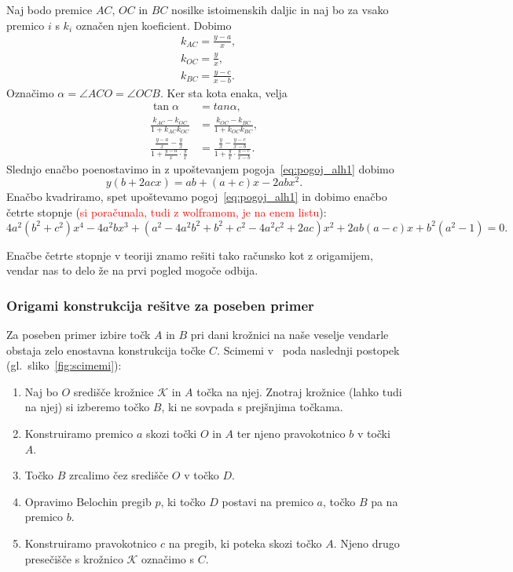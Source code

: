 Naj bodo premice $AC$, $OC$ in $BC$ nosilke istoimenskih daljic in naj bo za vsako premico $i$ s $k_i$ označen njen koeficient. Dobimo
\begin{align*}
    &k_{AC} = \frac{y-a}{x}, \\
    &k_{OC} = \frac{y}{x}, \\
    &k_{BC} = \frac{y-c}{x-b}.
\end{align*}
Označimo $\alpha = \angle ACO = \angle OCB$. Ker sta kota enaka, velja
\begin{align*}
    \tan \alpha &= tan \alpha, \\
    \frac{k_{AC} - k_{OC}}{1 + k_{AC} k_{OC}} &= \frac{k_{OC} - k_{BC}}{1 + k_{OC} k_{BC}}, \\
    \frac{\frac{y-a}{x} - \frac{y}{x}}{1 + \frac{y-a}{x} \cdot \frac{y}{x}} &= \frac{\frac{y}{x} - \frac{y-c}{x-b}}{1 + \frac{y}{x} \cdot \frac{y-c}{x-b}}.
\end{align*}
Slednjo enačbo poenostavimo in z upoštevanjem pogoja~\ref{eq:pogoj_alh1} dobimo
$$ y(b + 2acx) = ab + (a+c)x - 2abx^2.$$
Enačbo kvadriramo, spet upoštevamo pogoj~\ref{eq:pogoj_alh1} in dobimo enačbo četrte stopnje (\textcolor{red}{si poračunala, tudi z wolframom, je na enem listu}):
$$ 4a^2(b^2 + c^2)x^4 - 4a^2bx^3 + (a^2 - 4a^2b^2 + b^2 + c^2 - 4a^2c^2 + 2ac)x^2 + 2ab(a-c)x + b^2(a^2-1) = 0.$$

Enačbe četrte stopnje v teoriji znamo rešiti tako računsko kot z origamijem, vendar nas to delo že na prvi pogled mogoče odbija.

\subsubsection*{Origami konstrukcija rešitve za poseben primer}

Za poseben primer izbire točk $A$ in $B$ pri dani krožnici na naše veselje vendarle obstaja zelo enostavna konstrukcija točke $C$. Scimemi v~\cite[str.\ 116-117]{scimemi2002} poda naslednji postopek (gl.\ sliko~\ref{fig:scimemi}):
\begin{enumerate}
    \item Naj bo $O$ središče krožnice $\mathcal{K}$ in $A$ točka na njej. Znotraj krožnice (lahko tudi na njej) si izberemo točko $B$, ki ne sovpada s prejšnjima točkama.
    \item Konstruiramo premico $a$ skozi točki $O$ in $A$ ter njeno pravokotnico $b$ v točki $A$.
    \item Točko $B$ zrcalimo čez središče $O$ v točko $D$.
    \item Opravimo Belochin pregib $p$, ki točko $D$ postavi na premico $a$, točko $B$ pa na premico $b$.
    \item Konstruiramo pravokotnico $c$ na pregib, ki poteka skozi točko $A$. Njeno drugo presečišče s krožnico $\mathcal{K}$ označimo s $C$.
\end{enumerate}

